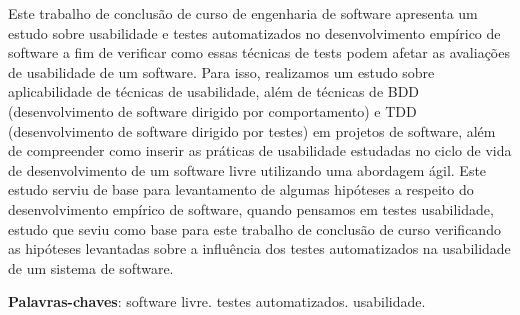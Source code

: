 \begin{resumo}

Este trabalho de conclusão de curso de engenharia de software apresenta um estudo sobre usabilidade e testes automatizados no desenvolvimento empírico de software a fim de verificar como essas técnicas de tests podem afetar as avaliações de usabilidade de um software. Para isso, realizamos um estudo sobre aplicabilidade de técnicas de usabilidade, além de técnicas de BDD (desenvolvimento de software dirigido por comportamento) e TDD (desenvolvimento de software dirigido por testes) em projetos de software, além de compreender como inserir as práticas de usabilidade estudadas no ciclo de vida de desenvolvimento de um software livre utilizando uma abordagem ágil. 
Este estudo serviu de base para levantamento de algumas hipóteses a respeito do desenvolvimento empírico de software, quando pensamos em testes usabilidade, estudo que seviu como base para este trabalho de conclusão de curso verificando as hipóteses levantadas sobre a influência dos testes automatizados na usabilidade de um sistema de software.


\vspace{\onelineskip}
    
 \noindent
 \textbf{Palavras-chaves}: software livre. testes automatizados. usabilidade.

\end{resumo}
